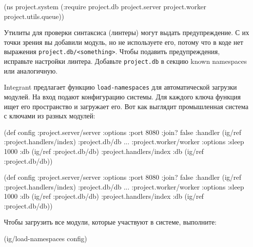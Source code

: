 \begin{english}
  \begin{clojure}
(ns project.system
  (:require project.db
            project.server
            project.worker
            project.utils.queue))
  \end{clojure}
\end{english}

Утилиты для проверки синтаксиса (линтеры) могут выдать предупреждение. С их
точки зрения вы добавили модуль, но не используете его, потому что в коде нет
выражения \verb|project.db/<something>|. Чтобы подавить предупреждения,
исправьте настройки линтера. Добавьте \verb|project.db| в секцию known
namespaces или аналогичную.


\mnoindent
Integrant предлагает функцию \verb|load-namespaces| для автоматической загрузки
модулей. На вход подают конфигурацию системы. Для каждого ключа функция ищет его
пространство и загружает его. Вот как выглядит промышленная система с ключами из
разных модулей:

\ifx\DEVICETYPE\MOBILE

\begin{english}
  \begin{clojure}
(def config
  {:project.server/server
   {:options {:port 8080 :join? false}
    :handler (ig/ref
               :project.handlers/index)}
   :project.db/db {...}
   :project.worker/worker
   {:options {:sleep 1000}
    :db      (ig/ref :project.db/db)}
   :project.handlers/index
   {:db (ig/ref :project.db/db)}})
  \end{clojure}
\end{english}

\else

\begin{english}
  \begin{clojure}
(def config
  {:project.server/server
   {:options {:port 8080 :join? false}
    :handler (ig/ref :project.handlers/index)}
   :project.db/db {...}
   :project.worker/worker
   {:options {:sleep 1000}
    :db      (ig/ref :project.db/db)}
   :project.handlers/index
   {:db (ig/ref :project.db/db)}})
  \end{clojure}
\end{english}

\fi

\noindent
Чтобы загрузить все модули, которые участвуют в системе, выполните:

\begin{english}
  \begin{clojure}
(ig/load-namespaces config)
  \end{clojure}
\end{english}

